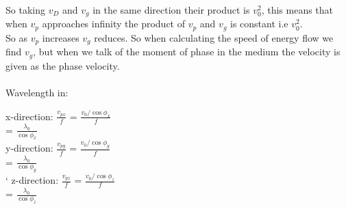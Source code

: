 So taking $v_D$ and $v_g$ in the same direction their product is $v_{0}^2$, this means that when $v_p$ approaches infinity the product of $v_p$ and $v_g$ is constant i.e $v_{0}^2$.
\\
So as $v_p$ increases $v_g$ reduces. So when calculating the speed of energy flow we find $v_g$, but when we talk of the moment of phase in the medium the velocity is given as the phase velocity.
\\
\\
Wavelength in:
\begin{center}
	x-direction: 	$\frac{v_{px}}{f}$ = $\frac{v_0/\cos\phi_{x}}{f}$\\
	= $\frac{\lambda_0}{\cos\phi_{x}}$\\
	y-direction: 	$\frac{v_{py}}{f}$ = $\frac{v_0/\cos\phi_{y}}{f}$\\
	= $\frac{\lambda_0}{\cos\phi_{y}}$\\`
	z-direction: 	$\frac{v_{pz}}{f}$ = $\frac{v_0/\cos\phi_{z}}{f}$\\
	= $\frac{\lambda_0}{\cos\phi_{z}}$
\end{center}